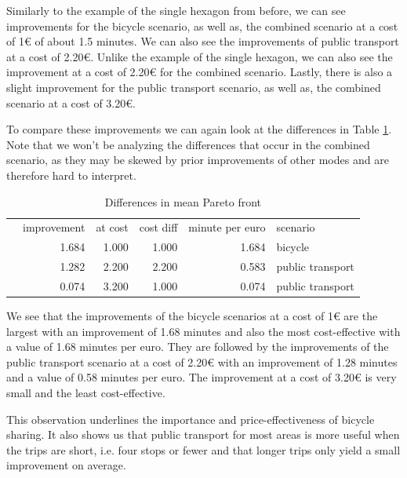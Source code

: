 Similarly to the example of the single hexagon from before, we can see improvements for the bicycle scenario, as well as, the combined scenario at a cost of 1€ of about 1.5 minutes.
We can also see the improvements of public transport at a cost of 2.20€.
Unlike the example of the single hexagon, we can also see the improvement at a cost of 2.20€ for the combined scenario.
Lastly, there is also a slight improvement for the public transport scenario, as well as, the combined scenario at a cost of 3.20€.

To compare these improvements we can again look at the differences in Table \ref{tab:differences_in_mean_pareto_front}.
Note that we won't be analyzing the differences that occur in the combined scenario, as they may be skewed by prior improvements of other modes and are therefore hard to interpret.

\begin{table}
  \caption{Differences in mean Pareto front}
  \label{tab:differences_in_mean_pareto_front}
  \begin{center}
    \begin{tabular}{lrrrrl}
     & improvement & at cost & cost diff & minute per euro & scenario \\
     & 1.684 & 1.000 & 1.000 & 1.684 & bicycle \\
     & 1.282 & 2.200 & 2.200 & 0.583 & public transport \\
     & 0.074 & 3.200 & 1.000 & 0.074 & public transport \\
    \end{tabular}
  \end{center}
\end{table}

We see that the improvements of the bicycle scenarios at a cost of 1€ are the largest with an improvement of 1.68 minutes and also the most cost-effective with a value of 1.68 minutes per euro.
They are followed by the improvements of the public transport scenario at a cost of 2.20€ with an improvement of 1.28 minutes and a value of 0.58 minutes per euro.
The improvement at a cost of 3.20€ is very small and the least cost-effective.


This observation underlines the importance and price-effectiveness of bicycle sharing.
It also shows us that public transport for most areas is more useful when the trips are short, i.e. four stops or fewer and that longer trips only yield a small improvement on average.

